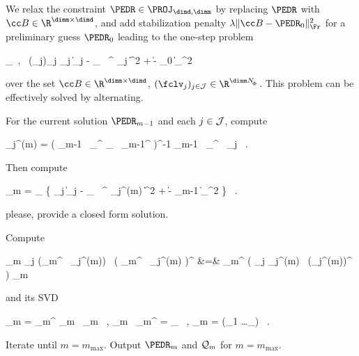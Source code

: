 We relax the constraint \( \PEDR \in \PROJ_{\dimd,\dimm} \) by 
replacing \( \PEDR \) with \( \BEDR \in \R^{\dimm \times \dimd} \), and
add stabilization penalty \( \lambda \| \BEDR - \PEDR_{0} \|_{\Fr}^{2} \)
for a preliminary guess \( \PEDR_{0} \) leading to the one-step problem
%
\begin{EQA}[c]
	\inf_{\BEDR \, , \, (\fclv_{j})_{j \in \JJJ} }
	\sum_{j \in \JJJ}  
	\bigl\| \Imav_{j} - \UV_{\jm} \, \BEDR^{\T} \fclv_{j} \bigr\|^{2}
	+ \lambda \| \BEDR - \PEDR_{0} \|_{\Fr}^{2}
	\, 
\label{ikdfjoiefjoieuAVEmi}
\end{EQA}
over the set \( \BEDR \in \R^{\dimm \times \dimd} \), \( (\fclv_{j})_{j \in \JJJ} \in \R^{\dimm \nSph} \).
This problem can be effectively solved by alternating.

\begin{mylist}
\item
For the current solution \( \PEDR_{m-1} \) and each \( j \in \mathcal{J} \), compute
\begin{EQA}[c]
	\fclv_{j}^{(m)}
	=
	\bigl( \PEDR_{m-1} \, \UV_{\jm}^{\T} \UV_{\jm} \, \PEDR_{m-1}^{\T} \bigr)^{-1} \PEDR_{m-1} \, \UV_{\jm}^{\T} \, \Imav_{j}
	\, .
\end{EQA}

\item
Then compute
\begin{EQA}[c]
	\BEDR_{m}
	=
	\arginf_{\BEDR} \biggl\{ \sum_{j \in \JJJ}  
	\bigl\| \Imav_{j} - \UV_{\jm} \, \BEDR^{\T} \fclv_{j}^{(m)} \bigr\|^{2}
	+ \lambda \| \BEDR - \PEDR_{m-1} \|_{\Fr}^{2} \biggr\}
	\, .
\end{EQA}
{\color{blue} please, provide a closed form solution}.
\item 
Compute
\begin{EQA}[rcl]
	\JEDR_{m}
	\eqdef
	\sum_{j \in \JJJ} (\BEDR_{m}^{\T} \, \fclv_{j}^{(m)}) \, \bigl( \BEDR_{m}^{\T} \, \fclv_{j}^{(m)} \bigr)^{\T}
	&=&
	\BEDR_{m}^{\T} \Bigl( \sum_{j \in \JJJ} {\fclv}_{j}^{(m)} \, ({\fclv}_{j}^{(m)})^{\T} \Bigr) \BEDR_{m}
	\, 
\end{EQA}
and its SVD
\begin{EQA}[c]
	\JEDR_{m}
	=
	\PEDR_{m}^{\T} \Lambda_{m} \, \PEDR_{m}
	\, ,
	\qquad
	\PEDR_{m} \, \PEDR_{m}^{\T}
	= 
	\Id_{\dimm}
	\, ,
	\quad
	\Lambda_{m} = \diag(\lambda_{1} \geq \ldots \geq \lambda_{\dimm})
	\, .
\end{EQA}

\item 
Iterate until \( m = m_{\max} \).
Output \( \PEDR_{m} \) and \( \mathcal{Q}_{m} \) for \( m = m_{\max} \).
\end{mylist}


